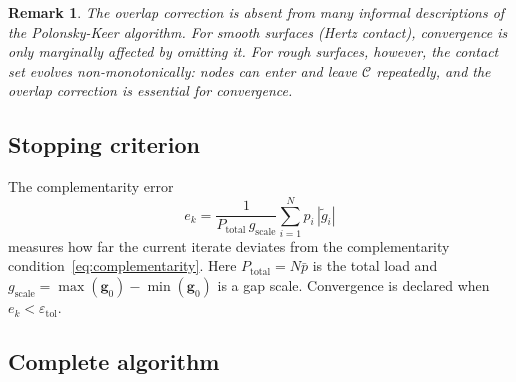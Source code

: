 \documentclass[11pt,a4paper]{article}
\newtheorem{remark}[theorem]{Remark}
\newcommand{\bg}{\mathbf{g}}
\newcommand{\calC}{\mathcal{C}}
\begin{document}
\begin{remark}
  The overlap correction is absent from many informal descriptions of the
  Polonsky-Keer algorithm.
  For smooth surfaces (Hertz contact), convergence is only marginally
  affected by omitting it.  For rough surfaces, however, the contact set
  evolves non-monotonically: nodes can enter and leave $\calC$ repeatedly,
  and the overlap correction is essential for convergence.
\end{remark}

\subsection{Stopping criterion}

The complementarity error
\begin{equation}
  e_k = \frac{1}{P_{\mathrm{total}}\,g_{\mathrm{scale}}}
        \sum_{i=1}^N p_i\,|\tilde g_i|
  \label{eq:stopping}
\end{equation}
measures how far the current iterate deviates from the complementarity
condition~\eqref{eq:complementarity}.
Here $P_{\mathrm{total}} = N\bar p$ is the total load and
$g_{\mathrm{scale}} = \max(\bg_0) - \min(\bg_0)$ is a gap scale.
Convergence is declared when $e_k < \varepsilon_{\mathrm{tol}}$.

\subsection{Complete algorithm}
\end{document}
